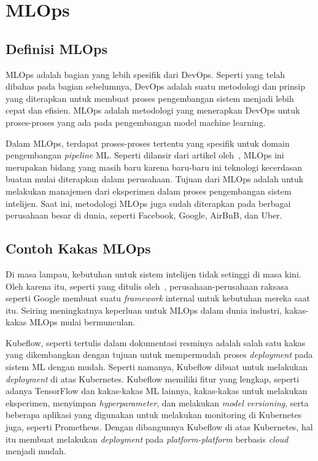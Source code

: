 \section{MLOps}

\subsection{Definisi MLOps}

MLOps adalah bagian yang lebih spesifik dari DevOps. 
Seperti yang telah dibahas pada bagian sebelumnya, DevOps adalah suatu metodologi dan prinsip yang diterapkan untuk membuat proses pengembangan sistem menjadi lebih cepat dan efisien. 
MLOps adalah metodologi yang menerapkan DevOps untuk proses-proses yang ada pada pengembangan model machine learning.

Dalam MLOps, terdapat proses-proses tertentu yang spesifik untuk domain pengembangan \textit{pipeline} ML.
Seperti dilansir dari artikel oleh~\cite{mlops}, MLOps ini merupakan bidang yang masih baru karena baru-baru ini teknologi kecerdasan buatan mulai diterapkan dalam perusahaan.
Tujuan dari MLOps adalah untuk melakukan manajemen dari eksperimen dalam proses pengembangan sistem intelijen.
Saat ini, metodologi MLOps juga sudah diterapkan pada berbagai perusahaan besar di dunia, seperti Facebook, Google, AirBnB, dan Uber.

\subsection{Contoh Kakas MLOps}

Di masa lampau, kebutuhan untuk sistem intelijen tidak setinggi di masa kini. 
Oleh karena itu, seperti yang ditulis oleh~\cite{mlops}, perusahaan-perusahaan raksasa seperti Google membuat suatu \textit{framework} internal untuk kebutuhan mereka saat itu.
Seiring meningkatnya keperluan untuk MLOps dalam dunia industri, kakas-kakas MLOps mulai bermunculan.

Kubeflow, seperti tertulis dalam dokumentasi resminya adalah salah satu kakas yang dikembangkan dengan tujuan untuk mempermudah proses \textit{deployment} pada sistem ML dengan mudah.
Seperti namanya, Kubeflow dibuat untuk melakukan \textit{deployment} di atas Kubernetes.
Kubeflow memiliki fitur yang lengkap, seperti adanya TensorFlow dan kakas-kakas ML lainnya, kakas-kakas untuk melakukan eksperimen, menyimpan \textit{hyperparameter}, dan melakukan \textit{model versioning}, serta beberapa aplikasi yang digunakan untuk melakukan monitoring di Kubernetes juga, seperti Prometheus.
Dengan dibangunnya Kubeflow di atas Kubernetes, hal itu membuat melakukan  \textit{deployment} pada \textit{platform-platform} berbasis \textit{cloud} menjadi mudah.

